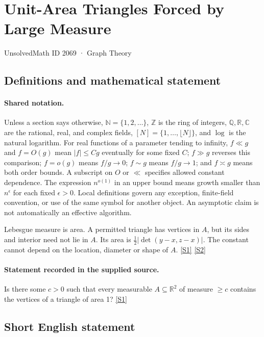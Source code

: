 \documentclass[11pt,a4paper]{article}
\newcommand{\N}{\mathbb{N}}
\newcommand{\Z}{\mathbb{Z}}
\newcommand{\Q}{\mathbb{Q}}
\newcommand{\R}{\mathbb{R}}
\newcommand{\C}{\mathbb{C}}
\newcommand{\sref}[2]{\hyperlink{source:#1:#2}{[S#2]}}
\begin{document}

\setcounter{section}{2068}

\section{Unit-Area Triangles Forced by Large Measure}\label{2069}

{\small\sffamily UnsolvedMath ID 2069 · Graph Theory}

\subsection{Definitions and mathematical statement}

\paragraph{Shared notation.}Unless a section says otherwise, $\N=\{1,2,\ldots\}$,
$\Z$ is the ring of integers, $\Q,\R,\C$ are the rational, real, and complex
fields, $[N]=\{1,\ldots,\lfloor N\rfloor\}$, and $\log$ is the natural
logarithm. For real functions of a parameter tending to infinity,
$f\ll g$ and $f=O(g)$ mean $|f|\leq Cg$ eventually for some fixed $C$;
$f\gg g$ reverses this comparison; $f=o(g)$ means $f/g\to0$;
$f\sim g$ means $f/g\to1$; and $f\asymp g$ means both order bounds.
A subscript on $O$ or $\ll$ specifies allowed constant dependence.
The expression $n^{o(1)}$ in an upper bound means growth smaller than
$n^\epsilon$ for each fixed $\epsilon>0$. Local definitions govern any
exception, finite-field convention, or use of the same symbol for another
object. An asymptotic claim is not automatically an effective algorithm.



Lebesgue measure is area. A permitted triangle has vertices in $A$, but its sides and interior need not lie in $A$. Its area is $\tfrac12|\det(y-x,z-x)|$. The constant cannot depend on the location, diameter or shape of $A$. \sref{2069}{1} \sref{2069}{2}

\paragraph{Statement recorded in the supplied source.}
Is there some $c>0$ such that every measurable $A\subseteq \mathbb{R}^2$ of measure $\geq c$ contains the vertices of a triangle of area 1? \sref{2069}{1}

\subsection{Short English statement}
\end{document}
